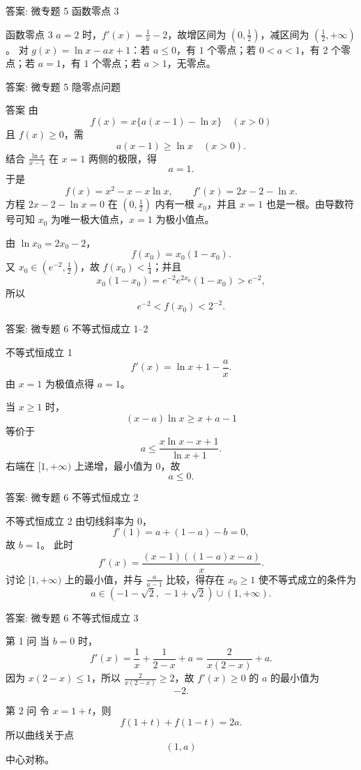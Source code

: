 ﻿\documentclass[aspectratio=169,10pt]{ctexbeamer}
\begin{document}
\begin{frame}[t]{答案: 微专题 5 函数零点 3}
\tiny
\begin{block}{函数零点 3}
$a=2$ 时，$f'(x)=\frac1x-2$，故增区间为 $\left(0,\frac12\right)$，减区间为 $\left(\frac12,+\infty\right)$。
对 $g(x)=\ln x-ax+1$：若 $a\le0$，有 $1$ 个零点；若 $0<a<1$，有 $2$ 个零点；若 $a=1$，有 $1$ 个零点；若 $a>1$，无零点。
\end{block}
\end{frame}

\begin{frame}[t]{答案: 微专题 5 隐零点问题}
\tiny
\begin{block}{答案}
由
\[
f(x)=x\{a(x-1)-\ln x\}\quad (x>0)
\]
且 $f(x)\ge0$，需
\[
a(x-1)\ge \ln x\quad (x>0).
\]
结合 $\frac{\ln x}{x-1}$ 在 $x=1$ 两侧的极限，得
\[
a=1.
\]
于是
\[
f(x)=x^2-x-x\ln x,\qquad f'(x)=2x-2-\ln x.
\]
方程 $2x-2-\ln x=0$ 在 $(0,\frac12)$ 内有一根 $x_0$，并且 $x=1$ 也是一根。由导数符号可知 $x_0$ 为唯一极大值点，$x=1$ 为极小值点。

由 $\ln x_0=2x_0-2$，
\[
f(x_0)=x_0(1-x_0).
\]
又 $x_0\in(e^{-2},\frac12)$，故 $f(x_0)<\frac14$；并且
\[
x_0(1-x_0)=e^{-2}e^{2x_0}(1-x_0)>e^{-2},
\]
所以
\[
e^{-2}<f(x_0)<2^{-2}.
\]
\end{block}
\end{frame}

\begin{frame}[t]{答案: 微专题 6 不等式恒成立 1--2}
\tiny
\begin{block}{不等式恒成立 1}
\[
f'(x)=\ln x+1-\frac ax.
\]
由 $x=1$ 为极值点得 $a=1$。

当 $x\ge1$ 时，
\[
(x-a)\ln x\ge x+a-1
\]
等价于
\[
a\le \frac{x\ln x-x+1}{\ln x+1}.
\]
右端在 $[1,+\infty)$ 上递增，最小值为 $0$，故
\[
a\le0.
\]
\end{block}
\end{frame}

\begin{frame}[t]{答案: 微专题 6 不等式恒成立 2}
\tiny
\begin{block}{不等式恒成立 2}
由切线斜率为 $0$，
\[
f'(1)=a+(1-a)-b=0,
\]
故 $b=1$。
此时
\[
f'(x)=\frac{(x-1)((1-a)x-a)}x.
\]
讨论 $[1,+\infty)$ 上的最小值，并与 $\frac{a}{a-1}$ 比较，得存在 $x_0\ge1$ 使不等式成立的条件为
\[
a\in(-1-\sqrt2,\,-1+\sqrt2)\cup(1,+\infty).
\]
\end{block}
\end{frame}

\begin{frame}[t]{答案: 微专题 6 不等式恒成立 3}
\tiny
\begin{block}{第 1 问}
当 $b=0$ 时，
\[
f'(x)=\frac1x+\frac1{2-x}+a=\frac2{x(2-x)}+a.
\]
因为 $x(2-x)\le1$，所以 $\frac2{x(2-x)}\ge2$，故 $f'(x)\ge0$ 的 $a$ 的最小值为
\[
-2.
\]
\end{block}
\begin{block}{第 2 问}
令 $x=1+t$，则
\[
f(1+t)+f(1-t)=2a.
\]
所以曲线关于点
\[
(1,a)
\]
中心对称。
\end{block}
\end{frame}
\end{document}
